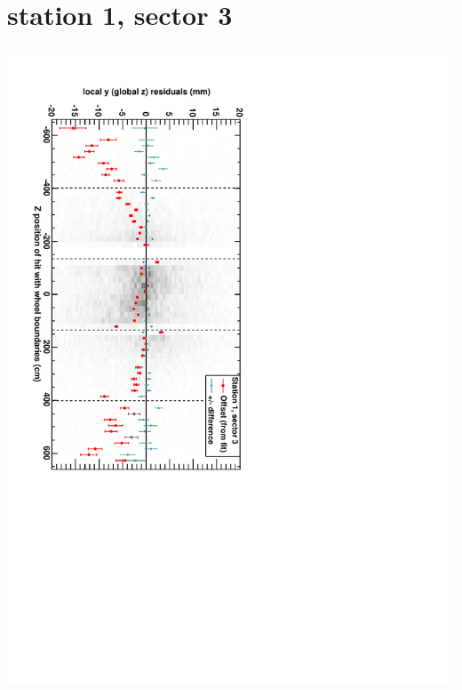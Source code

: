 \documentclass[compress]{beamer}
\begin{document}
\section*{station 1, sector 3}
\begin{frame} \vfill \mbox{\hspace{-1 cm}\includegraphics[height=1.2\linewidth, angle=90]{DTzVsZ_st1_sr03.pdf}} \end{frame}
\end{document}
